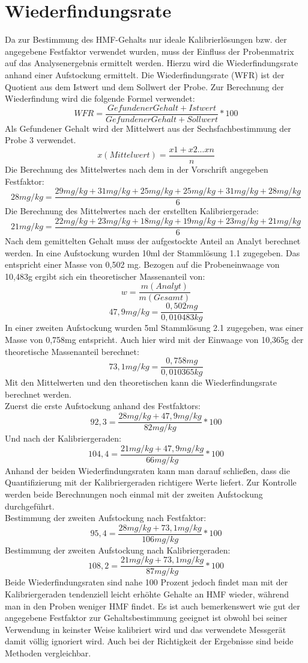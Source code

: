 \section{Wiederfindungsrate}
Da zur Bestimmung des HMF-Gehalts nur ideale Kalibrierlösungen bzw. der angegebene Festfaktor verwendet wurden, muss der Einfluss der Probenmatrix auf das Analysenergebnis ermittelt werden. Hierzu wird die Wiederfindungsrate anhand einer Aufstockung ermittelt. Die Wiederfindungsrate (WFR) ist der Quotient aus dem Istwert und dem Sollwert der Probe. Zur Berechnung der Wiederfindung wird die folgende Formel verwendet:
	\[WFR=\frac{ Gefundener Gehalt + Istwert }{ Gefundener Gehalt + Sollwert } *100 \]
Als Gefundener Gehalt wird der Mittelwert aus der Sechsfachbestimmung der Probe 3 verwendet.
	\[x(Mittelwert)=\frac{ x1+x2...xn }{ n } \]
Die Berechnung des Mittelwertes nach dem in der Vorschrift angegeben  Festfaktor:
	\[28mg/kg=\frac{ 29mg/kg+31mg/kg+25mg/kg+25mg/kg+31mg/kg+28mg/kg }{ 6 } \]
Die Berechnung des Mittelwertes nach der erstellten Kalibriergerade:
	\[21mg/kg=\frac{ 22mg/kg+23mg/kg+18mg/kg+19mg/kg+23mg/kg+21mg/kg }{ 6 } \]
Nach dem gemittelten Gehalt muss der aufgestockte Anteil an Analyt berechnet werden. In eine Aufstockung wurden 10ml der Stammlösung 1.1 zugegeben. Das entspricht einer Masse von 0,502 mg. Bezogen auf die Probeneinwaage von 10,483g ergibt sich ein theoretischer Massenanteil von:  
	\[w=\frac{ m(Analyt) }{ m(Gesamt) } \]
	\[47,9mg/kg=\frac{ 0,502mg }{ 0,010483kg } \]
In einer zweiten Aufstockung wurden 5ml Stammlösung 2.1 zugegeben, was einer Masse von 0,758mg entspricht. Auch hier wird mit der Einwaage von 10,365g der theoretische Massenanteil berechnet:
	\[73,1mg/kg=\frac{ 0,758mg }{ 0,010365kg } \]
Mit den Mittelwerten und den theoretischen kann die Wiederfindungsrate berechnet werden.\\
Zuerst die erste Aufstockung anhand des Festfaktors:
	\[92,3=\frac{ 28mg/kg + 47,9mg/kg }{ 82mg/kg } *100 \]
Und nach der Kalibriergeraden:
	\[104,4=\frac{ 21mg/kg + 47,9mg/kg }{ 66mg/kg } *100 \]
Anhand der beiden Wiederfindungsraten kann man darauf schließen, dass die Quantifizierung mit der Kalibriergeraden richtigere Werte liefert. Zur Kontrolle werden beide Berechnungen noch einmal mit der zweiten Aufstockung durchgeführt.\\
Bestimmung der zweiten Aufstockung nach Festfaktor:
	\[95,4=\frac{ 28mg/kg + 73,1mg/kg }{ 106mg/kg } *100 \]
Bestimmung der zweiten Aufstockung nach Kalibriergeraden:
	\[108,2=\frac{ 21mg/kg + 73,1mg/kg }{ 87mg/kg } *100 \]
Beide Wiederfindungsraten sind nahe 100 Prozent jedoch findet man mit der Kalibriergeraden tendenziell leicht erhöhte Gehalte an HMF wieder, während man in den Proben weniger HMF findet. Es ist auch bemerkenswert wie gut der angegebene Festfaktor zur Gehaltsbestimmung geeignet ist obwohl bei seiner Verwendung in keinster Weise kalibriert wird und das verwendete Messgerät damit völlig ignoriert wird. Auch bei der Richtigkeit der Ergebnisse sind beide Methoden vergleichbar.
	

